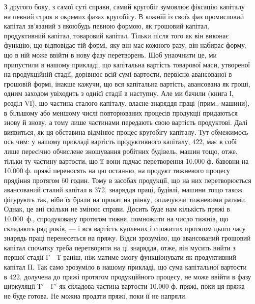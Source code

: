 З другого боку, з самої суті справи, самий кругобіг зумовлює фіксацію
капіталу на певний строк в окремих фазах кругобігу. В кожній із
своїх фаз промисловий капітал зв’язаний з якоюбудь певною формою,
як грошовий капітал, продуктивний капітал, товаровий капітал. Тільки
після того як він виконає функцію, що відповідає тій формі, яку він
має кожного разу, він набирає форму, що в ній може ввійти в нову
фазу перетворень. Щоб унаочнити це, ми припустили в нашому прикладі,
що капітальна вартість товарової маси, утвореної на продукційній стадії,
дорівнює всій сумі вартости, первісно авансованої в грошовій формі,
інакше кажучи, що вся капітальна вартість, авансована як гроші, одним
заходом увіходить з однієї стадії в наступну. Але ми бачили (книга І,
розділ VI), що частина сталого капіталу, власне знаряддя праці (прим.,
машини), в більшому або меншому числі повторюваних процесів продукції
придаються знову й знову, а тому лише частинами передають свою вартість
продуктові. Далі виявиться, як ця обставина відмінює процес кругобігу
капіталу. Тут обмежимось ось чим: у нашому прикладі вартість
продуктивного капіталу, 422, має в собі лише пересічно обчислене
зношування робітних будівель, машин тощо, отже, тільки ту частину
вартости, що її вони підчас перетворення \num{10.000} ф. бавовни на \num{10.000} ф.
пряжі переносять на цю останню, на продукт тижневого процесу прядіння
протягом 60 годин. Тому в засобах продукції, що на них перетворюється
авансований сталий капітал в 372, знаряддя праці, будівлі,
машини тощо також фігурують так, ніби їх брали на прокат на ринку,
оплачуючи тижневими ратами. Однак, це ані скільки не змінює справи.
Досить буде нам кількість пряжі в \num{10.000}~ф., спродуковану протягом
тижня, помножити на число тижнів, що складають ряд років, — і вся
вартість куплених і спожитих протягом цього часу знарядь праці перенесеться
на пряжу. Відси зрозуміло, що авансований грошовий капітал
спочатку треба перетворити на ці знаряддя, отже, він мусить вийти з
першої стадії $Г — Т$ раніш, ніж матиме змогу функціонувати як продуктивний
капітал $П$. Так само зрозуміло в нашому прикладі, що сума
капітальної вартости в 422, долучена до пряжі протягом продукційного
процесу, не може ввійти в фазу циркуляції $Т' — Г'$ як складова
частина вартости \num{10.000} ф. пряжі, поки ця пряжа не буде готова.
Не можна продати пряжі, поки її не напряли.

